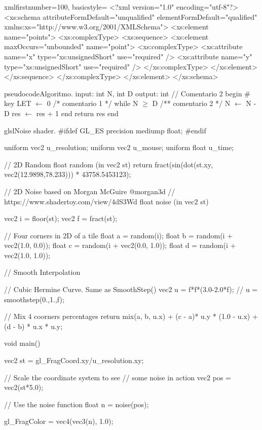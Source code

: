 \begin{sourcecodep}{xml}{firstnumber=100, basicstyle={\fontsize{7}{10}\selectfont\ttfamily}}{}
<?xml version="1.0" encoding="utf-8"?>
<xs:schema attributeFormDefault="unqualified" elementFormDefault="qualified"
   xmlns:xs="http://www.w3.org/2001/XMLSchema">
  <xs:element name="points">
    <xs:complexType>
      <xs:sequence>
        <xs:element maxOccurs="unbounded" name="point">
          <xs:complexType>
            <xs:attribute name="x" type="xs:unsignedShort" use="required" />
            <xs:attribute name="y" type="xs:unsignedShort" use="required" />
          </xs:complexType>
        </xs:element>
      </xs:sequence>
    </xs:complexType>
  </xs:element>
</xs:schema>
\end{sourcecodep}

\begin{sourcecode}{pseudocode}{Algoritmo.}
input: int N, int D %
output: int // Comentario 2
begin # key
	LET $\gets$ 0 /* comentario 1 */
	while N $\geq$ D /** comentario 2 */
		N $\gets$ N - D
		res $\gets$ res + 1      
	end
	return res
end    
\end{sourcecode}

\clearpage
\begin{sourcecode}{glsl}{Noise shader.}
#ifdef GL_ES
precision mediump float;
#endif

uniform vec2 u_resolution;
uniform vec2 u_mouse;
uniform float u_time;

// 2D Random
float random (in vec2 st) {
	return fract(sin(dot(st.xy,
	vec2(12.9898,78.233)))
	* 43758.5453123);
}

// 2D Noise based on Morgan McGuire @morgan3d
// https://www.shadertoy.com/view/4dS3Wd
float noise (in vec2 st) {
	vec2 i = floor(st);
	vec2 f = fract(st);
	
	// Four corners in 2D of a tile
	float a = random(i);
	float b = random(i + vec2(1.0, 0.0));
	float c = random(i + vec2(0.0, 1.0));
	float d = random(i + vec2(1.0, 1.0));
	
	// Smooth Interpolation
	
	// Cubic Hermine Curve.  Same as SmoothStep()
	vec2 u = f*f*(3.0-2.0*f);
	// u = smoothstep(0.,1.,f);
	
	// Mix 4 coorners percentages
	return mix(a, b, u.x) +
	(c - a)* u.y * (1.0 - u.x) +
	(d - b) * u.x * u.y;
}

void main() {
	vec2 st = gl_FragCoord.xy/u_resolution.xy;
	
	// Scale the coordinate system to see
	// some noise in action
	vec2 pos = vec2(st*5.0);
	
	// Use the noise function
	float n = noise(pos);
	
	gl_FragColor = vec4(vec3(n), 1.0);
}
\end{sourcecode}

